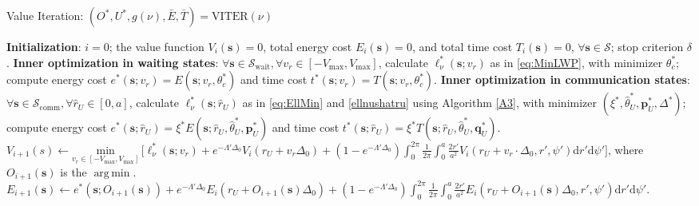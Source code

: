 \documentclass[10pt, twocolumn]{IEEEtran}
\theoremstyle{plain}
\theoremstyle{definition}
\theoremstyle{remark}
\DeclareMathOperator*{\argmin}{arg\,min}
\begin{document}
\begin{algorithm*}[t]
\caption{Value Iteration: $(O^{*},U^{*},g(\nu),\bar{E},\bar{T})=\mathrm{VITER}(\nu)$}\label{A1}
    \begin{algorithmic}[1]
        \scriptsize
        \State \textbf{Initialization}: $i{=}0$; the value function $V_{i}(\mathbf{s}){=}0$, total energy cost $E_{i}(\mathbf{s}){=}0$, and total time cost $T_{i}(\mathbf{s}){=}0$, ${\forall}\mathbf{s}{\in}\mathcal{S}$; stop criterion $\delta$.
        \vspace{0.1cm}
    	\State \textbf{Inner optimization in waiting states}: ${\forall}\mathbf{s}{\in}\mathcal{S}_{\mathrm{wait}}, {\forall}v_{r}{\in}[-V_{\mathrm{max}},V_{\mathrm{max}}]$, calculate $\ell_{\nu}^{*}(\mathbf{s};v_{r})$ as in \eqref{eq:MinLWP}, with minimizer $\theta_{c}^{*}$; compute energy cost $e^{*}(\mathbf{s};v_{r}){=}E(\mathbf{s};v_{r},\theta_{c}^*)$ and time cost $t^{*}(\mathbf{s};v_r){=}T(\mathbf{s};v_{r},\theta_{c}^{*})$.
    	\vspace{0.1cm}
    	\State \textbf{Inner optimization in communication states}: ${\forall}\mathbf{s}{\in}\mathcal{S}_{\mathrm{comm}}, {\forall}\hat{r}_{U}{\in}[0,a]$, calculate $\ell_{\nu}^{*}(\mathbf{s};\hat{r}_{U})$ as in \eqref{eq:EllMin} and \eqref{ellnushatru} using Algorithm \ref{A3}, with minimizer $(\xi^{*},\hat{\theta}_{U}^{*},\mathbf{p}_{U}^{*},\Delta^{*})$; compute energy cost $e^{*}(\mathbf{s};\hat{r}_{U}){=}\xi^{*}E(\mathbf{s};\hat{r}_{U},\hat{\theta}_{U}^{*},\mathbf{p}_{U}^{*})$ and time cost $t^{*}(\mathbf{s};\hat{r}_{U}){=}\xi^{*}T(\mathbf{s};\hat{r}_{U},\hat{\theta}_{U}^{*},\mathbf{q}_{U}^{*})$.
    	\vspace{0.1cm}
        \Repeat
            \vspace{0.1cm}
        	    \vspace{0.1cm}
        		\State $V_{i{+}1}(s){\gets}\underset{v_{r}{\in}[-V_{\mathrm{max}},V_{\mathrm{max}}]}{\mathrm{min}}\, \big[\ell_{\nu}^{*}(\mathbf{s};v_{r}){+}e^{-\Lambda'\Delta_{0}}V_{i}(r_{U}{+}v_{r}\Delta_{0}){+} \left(1{-}e^{-\Lambda'\Delta_{0}}\right)\int_{0}^{2\pi}\frac{1}{2\pi}\int_{0}^{a}\frac{2r'}{a^{2}}V_{i}(r_{U}{+}v_{r}{\cdot}\Delta_{0},r',\psi')\mathrm{d}r'\mathrm{d}\psi'\big]$,
        		\vspace{0.1cm}
        		\Statex \hspace{2.0cm} where $O_{i{+}1}(\mathbf{s})$ is the $\argmin$.
        		\vspace{0.1cm}
        		\State $E_{i{+}1}(\mathbf{s}){\gets}e^{*}(\mathbf{s};O_{i{+}1}(\mathbf{s})){+}e^{-\Lambda'\Delta_{0}}E_{i}(r_{U}{+}O_{i{+}1}(\mathbf{s})\Delta_{0}){+}\left(1{-}e^{-\Lambda'\Delta_{0}}\right)\int_{0}^{2\pi}\frac{1}{2\pi}\int_{0}^{a}\frac{2r'}{a^{2}}E_{i}(r_{U}{+}O_{i{+}1}(\mathbf{s})\Delta_{0},r',\psi')\mathrm{d}r'\mathrm{d}\psi'$.

\end{algorithmic}
\end{algorithm*}
\end{document}
